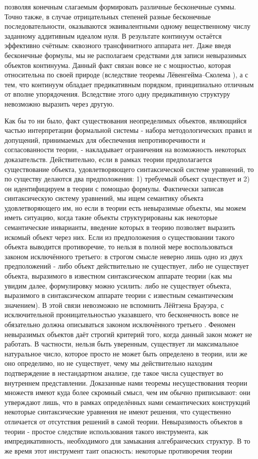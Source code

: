 \documentclass[12pt]{article}
\begin{document}
позволяя конечным слагаемым формировать различные бесконечные суммы. Точно также, в случае отрицательных степеней разные бесконечные последовательности, оказываются эквивалентными одному вещественному числу заданному аддитивным идеалом нуля. В результате континуум остаётся эффективно счётным: сквозного трансфинитного аппарата нет. Даже введя бесконечные формулы, мы не располагаем средствами для записи невыразимых объектов континуума. Данный факт связан вовсе не с мощностью, которая относительна по своей природе (вследствие теоремы Лёвенгейма–Сколема \cite{skolem-set-theory}), а с тем, что континуум обладает предикативным порядком, принципиально отличным от вполне упорядочения. Вследствие этого одну предикативную структуру невозможно выразить через другую.

Как бы то ни было, факт существования неопределимых объектов, являющийся частью интерпретации формальной системы - набора методологических правил и допущений, принимаемых для обеспечения непротиворечивости и согласованности теории, - накладывает ограничения на возможность некоторых доказательств. Действительно, если в рамках теории предполагается существование объекта, удовлетворяющего синтаксической системе уравнений, то по существу делаются два предположения: 1) требуемый объект существует и 2) он идентифицируем в теории с помощью формулы. Фактически записав синтаксическую систему уравнений, мы ищем семантику объекта удовлетворяющего им, но если в теории есть невыразимые объекты, мы можем иметь ситуацию, когда такие объекты структурированы как некоторые семантические инварианты, введение которых в теорию позволяет выразить искомый объект через них. Если из предположения о существовании такого объекта выводится противоречие, то нельзя в полной мере воспользоваться законом исключённого третьего: в строгом смысле неверно лишь одно из двух предположений - либо объект действительно не существует, либо не существует объекта, выразимого в известном синтаксическом аппарате теории (как мы увидим далее, формулировку можно усилить: либо не существует объекта, выразимого в синтаксическом аппарате теории с известным семантическим значением). В этой связи невозможно не вспомнить Лёйтзена Брауэра, с исключительной проницательностью указавшего, что бесконечность вовсе не обязательно должна описываться законом исключённого третьего \cite{brouwer}. Феномен невыразимых объектов даёт строгий критерий того, когда данный закон может не работать. В частности, нельзя быть уверенным, существует ли максимальное натуральное число, которое просто не может быть определено в теории, или же оно определимо, но не существует, чему мы действительно находим подтверждение в нестандартном анализе, где такое числа существует во внутреннем представлении. Доказанные нами теоремы несуществования теории множеств имеют куда более скромный смысл, чем им обычно приписывают: они утверждают лишь, что в рамках определённых нами семантических конструкций некоторые синтаксические уравнения не имеют решения, что существенно отличается от отсутствия решений в самой теории. Невыразимость объектов в теории - простое следствие использования такого инструмента, как импредикативность, необходимого для замыкания алгебраических структур. В то же время этот инструмент таит опасность: некоторые противоречия теории 
\end{document}
